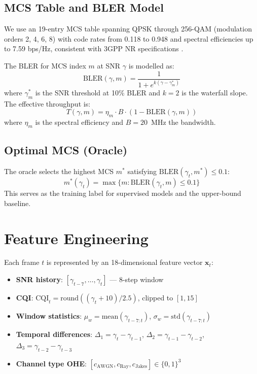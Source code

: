 \documentclass[conference]{IEEEtran}
\begin{document}
\subsection{MCS Table and BLER Model}

We use an 19-entry MCS table spanning QPSK through 256-QAM
(modulation orders 2, 4, 6, 8) with code rates from 0.118 to 0.948
and spectral efficiencies up to 7.59 bps/Hz, consistent with
3GPP NR specifications \cite{3gpp_38214}.

The BLER for MCS index $m$ at SNR $\gamma$ is modelled as:
\begin{equation}
  \text{BLER}(\gamma, m) = \frac{1}{1 + e^{k(\gamma - \gamma_m^*) }}
\end{equation}
where $\gamma_m^*$ is the SNR threshold at 10\% BLER and $k=2$ is the
waterfall slope. The effective throughput is:
\begin{equation}
  T(\gamma, m) = \eta_m \cdot B \cdot (1 - \text{BLER}(\gamma, m))
\end{equation}
where $\eta_m$ is the spectral efficiency and $B = 20$~MHz the bandwidth.

\subsection{Optimal MCS (Oracle)}

The oracle selects the highest MCS $m^*$ satisfying
$\text{BLER}(\gamma_t, m^*) \leq 0.1$:
\begin{equation}
  m^*(\gamma_t) = \max \{ m : \text{BLER}(\gamma_t, m) \leq 0.1 \}
\end{equation}
This serves as the training label for supervised models and the upper-bound
baseline.

\section{Feature Engineering}

Each frame $t$ is represented by an 18-dimensional feature vector $\mathbf{x}_t$:

\begin{itemize}
  \item \textbf{SNR history}: $[\gamma_{t-7}, \ldots, \gamma_t]$ — 8-step window
  \item \textbf{CQI}: $\text{CQI}_t = \text{round}((\gamma_t + 10)/2.5)$, clipped to $[1,15]$
  \item \textbf{Window statistics}: $\mu_w = \text{mean}(\gamma_{t-7:t})$,
        $\sigma_w = \text{std}(\gamma_{t-7:t})$
  \item \textbf{Temporal differences}: $\Delta_1 = \gamma_t - \gamma_{t-1}$,
        $\Delta_2 = \gamma_{t-1} - \gamma_{t-2}$, $\Delta_3 = \gamma_{t-2} - \gamma_{t-3}$
  \item \textbf{Channel type OHE}: $[c_\text{AWGN}, c_\text{Ray}, c_\text{Jakes}] \in \{0,1\}^3$
\end{itemize}
\end{document}
